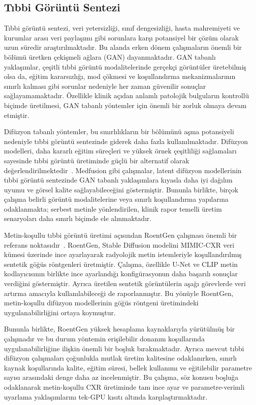 \documentclass[11pt]{article}
\begin{document}
\subsection{Tıbbi Görüntü Sentezi}

Tıbbi görüntü sentezi, veri yetersizliği, sınıf dengesizliği, hasta
mahremiyeti ve kurumlar arası veri paylaşımı gibi sorunlara karşı potansiyel
bir çözüm olarak uzun süredir araştırılmaktadır. Bu alanda erken dönem
çalışmaların önemli bir bölümü üretken çekişmeli ağlara (GAN) dayanmaktadır.
GAN tabanlı yaklaşımlar, çeşitli tıbbi görüntü modalitelerinde gerçekçi
görüntüler üretebilmiş olsa da, eğitim kararsızlığı, mod çökmesi ve
koşullandırma mekanizmalarının sınırlı kalması gibi sorunlar nedeniyle her
zaman güvenilir sonuçlar sağlayamamaktadır. Özellikle klinik açıdan anlamlı
patolojik bulguların kontrollü biçimde üretilmesi, GAN tabanlı yöntemler için
önemli bir zorluk olmaya devam etmiştir.

Difüzyon tabanlı yöntemler, bu sınırlılıkların bir bölümünü aşma potansiyeli
nedeniyle tıbbi görüntü sentezinde giderek daha fazla kullanılmaktadır.
Difüzyon modelleri, daha kararlı eğitim süreçleri ve yüksek örnek çeşitliliği
sağlamaları sayesinde tıbbi görüntü üretiminde güçlü bir alternatif olarak
değerlendirilmektedir~\cite{medfusion}. Medfusion gibi çalışmalar, latent
difüzyon modellerinin tıbbi görüntü sentezinde GAN tabanlı yaklaşımlara kıyasla
daha iyi dağılım uyumu ve görsel kalite sağlayabileceğini göstermiştir.
Bununla birlikte, birçok çalışma belirli görüntü modalitelerine veya sınırlı
koşullandırma yapılarına odaklanmakta; serbest metinle yönlendirilen, klinik
rapor temelli üretim senaryoları daha sınırlı biçimde ele alınmaktadır.

Metin-koşullu tıbbi görüntü üretimi açısından RoentGen çalışması önemli bir
referans noktasıdır~\cite{roentgen}. RoentGen, Stable Diffusion modelini
MIMIC-CXR veri kümesi üzerinde ince ayarlayarak radyolojik metin istemleriyle
koşullandırılmış sentetik göğüs röntgenleri üretmiştir. Çalışma, özellikle
U-Net ve CLIP metin kodlayıcısının birlikte ince ayarlandığı konfigürasyonun
daha başarılı sonuçlar verdiğini göstermiştir. Ayrıca üretilen sentetik
görüntülerin aşağı görevlerde veri artırma amacıyla kullanılabileceği de
raporlanmıştır. Bu yönüyle RoentGen, metin-koşullu difüzyon modellerinin göğüs
röntgeni üretimindeki uygulanabilirliğini ortaya koymuştur.

Bununla birlikte, RoentGen yüksek hesaplama kaynaklarıyla yürütülmüş bir
çalışmadır ve bu durum yöntemin erişilebilir donanım koşullarında
uygulanabilirliğine ilişkin önemli bir boşluk bırakmaktadır. Ayrıca mevcut
tıbbi difüzyon çalışmaları çoğunlukla mutlak üretim kalitesine odaklanırken,
sınırlı kaynak koşullarında kalite, eğitim süresi, bellek kullanımı ve
eğitilebilir parametre sayısı arasındaki denge daha az incelenmiştir. Bu
çalışma, söz konusu boşluğa odaklanarak metin-koşullu CXR üretiminde tam ince
ayar ve parametre-verimli uyarlama yaklaşımlarını tek-GPU kısıtı altında
karşılaştırmaktadır.
\end{document}
